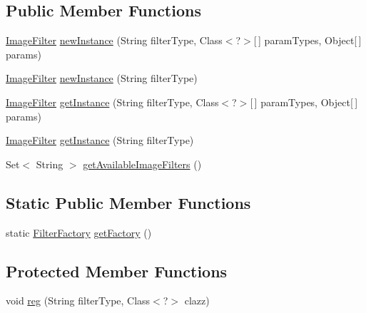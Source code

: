 \subsection*{Public Member Functions}
\begin{DoxyCompactItemize}
\item 
\hyperlink{classswp_1_1tuilmenau_1_1carduinodroid_1_1_filter_1_1_image_filter}{Image\+Filter} \hyperlink{classswp_1_1tuilmenau_1_1carduinodroid_1_1_filter_1_1_filter_factory_aff05b810c3776ef74643da75f46a2ceb}{new\+Instance} (String filter\+Type, Class$<$?$>$\mbox{[}$\,$\mbox{]} param\+Types, Object\mbox{[}$\,$\mbox{]} params)
\item 
\hyperlink{classswp_1_1tuilmenau_1_1carduinodroid_1_1_filter_1_1_image_filter}{Image\+Filter} \hyperlink{classswp_1_1tuilmenau_1_1carduinodroid_1_1_filter_1_1_filter_factory_a03f77013bf07ec12a141c947816072e5}{new\+Instance} (String filter\+Type)
\item 
\hyperlink{classswp_1_1tuilmenau_1_1carduinodroid_1_1_filter_1_1_image_filter}{Image\+Filter} \hyperlink{classswp_1_1tuilmenau_1_1carduinodroid_1_1_filter_1_1_filter_factory_aaabe4677d10eb29acd7efa33448d890d}{get\+Instance} (String filter\+Type, Class$<$?$>$\mbox{[}$\,$\mbox{]} param\+Types, Object\mbox{[}$\,$\mbox{]} params)
\item 
\hyperlink{classswp_1_1tuilmenau_1_1carduinodroid_1_1_filter_1_1_image_filter}{Image\+Filter} \hyperlink{classswp_1_1tuilmenau_1_1carduinodroid_1_1_filter_1_1_filter_factory_a7fa87ecc5317ef686e0fcbc995c4390d}{get\+Instance} (String filter\+Type)
\item 
Set$<$ String $>$ \hyperlink{classswp_1_1tuilmenau_1_1carduinodroid_1_1_filter_1_1_filter_factory_aa0f244ab827c355cd7fc4a7eb7f95096}{get\+Available\+Image\+Filters} ()
\end{DoxyCompactItemize}
\subsection*{Static Public Member Functions}
\begin{DoxyCompactItemize}
\item 
static \hyperlink{classswp_1_1tuilmenau_1_1carduinodroid_1_1_filter_1_1_filter_factory}{Filter\+Factory} \hyperlink{classswp_1_1tuilmenau_1_1carduinodroid_1_1_filter_1_1_filter_factory_af9d1456b900a8d8f2874ef8d7dfbd702}{get\+Factory} ()
\end{DoxyCompactItemize}
\subsection*{Protected Member Functions}
\begin{DoxyCompactItemize}
\item 
void \hyperlink{classswp_1_1tuilmenau_1_1carduinodroid_1_1_filter_1_1_filter_factory_a3d602fb6f6b280e7135e1fa41aaa6a29}{reg} (String filter\+Type, Class$<$?$>$ clazz)
\end{DoxyCompactItemize}
